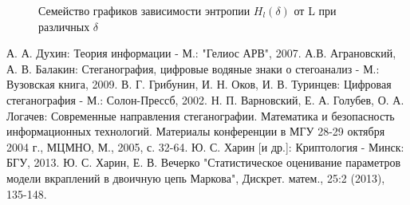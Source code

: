 ﻿\documentclass[a4paper,12pt]{article}
\theoremstyle{plain}
\begin{document}
							\begin{figure}[h]
								\caption{Семейство графиков зависимости энтропии $H_l{(\delta)}$ от L при различных $\delta$}
								\label{ris:"h_l.png"}
							\end{figure}
						
						
						
					


\clearpage




\begin{thebibliography}{0}
	А. А. Духин: Теория информации - М.: "Гелиос АРВ", 2007.
	А.В. Аграновский, А. В. Балакин: Стеганография, цифровые водяные знаки о стегоанализ - М.: Вузовская книга, 2009.
	 В. Г. Грибунин, И. Н. Оков, И. В. Туринцев: Цифровая стеганография - М.: Солон-Прессб, 2002.
	Н. П. Варновский, Е. А. Голубев, О. А. Логачев: Современные направления стеганографии. Математика и безопасность информационных технологий. Материалы конференции в МГУ 28-29 октября 2004 г., МЦМНО, М., 2005, с. 32-64.
	Ю. С. Харин [и др.]: Криптология - Минск: БГУ, 2013.
	Ю. С. Харин, Е. В. Вечерко "Статистическое оценивание параметров модели вкраплений в двоичную цепь Маркова", Дискрет. матем., 25:2 (2013), 135-148.
\end{thebibliography}
\end{document}

